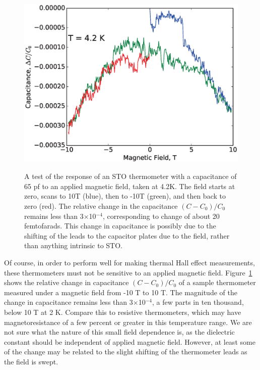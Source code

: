 \documentclass{thesis-umich}
\begin{document}
\begin{figure} \caption[Field response of an STO thermometer]{A test of the response of an STO thermometer with a capacitance of 65 pf to an
    applied magnetic field, taken at 4.2K.  The field starts at zero, scans to
    10T (blue), then to -10T (green), and then back to zero (red).  The relative
    change in the capacitance $(C - C_0)/C_0$ remains less than
  3$\times$10$^{-4}$, corresponding to change of about 20 femtofarads. This
change in capacitance is possibly due to the shifting of the leads to the
capacitor plates due to the field, rather than anything intrinsic to STO.}
\centering \includegraphics[width=\columnwidth]{figures/cvb_apl.eps}\label{b_test}
\end{figure}

Of course, in order to perform well for making thermal Hall effect measurements,
these thermometers must not be sensitive to an applied magnetic field.
Figure~\ref{b_test} shows the relative change in capacitance $(C-C_0)/C_0$ of a
sample thermometer measured under a magnetic field from -10 T to 10 T.  The
magnitude of the change in capacitance remains less than 3$\times$10$^{-4}$, a
few parts in ten thousand, below 10 T at 2 K. Compare this to resistive
thermometers, which may have magnetoresistance of a few percent or greater in
this temperature range\cite{Heine1998,Goodrich1998}. We are not sure what the nature
of this small field dependence is, as the dielectric constant should be
independent of applied magnetic field. However, at least some of the change may
be related to the slight shifting of the thermometer leads as the field is
swept.
\end{document}
